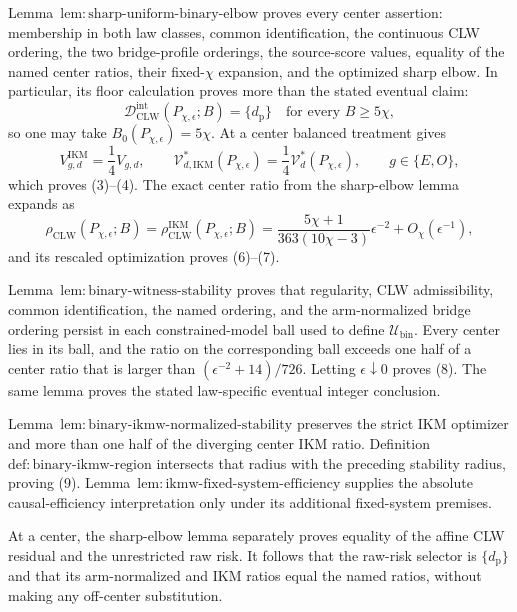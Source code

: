 Lemma~\(\mathrm{lem{:}sharp\text{-}uniform\text{-}binary\text{-}elbow}\) proves every center assertion: membership in both law classes, common identification, the continuous CLW ordering, the two bridge-profile orderings, the source-score values, equality of the named center ratios, their fixed-\(\chi\) expansion, and the optimized sharp elbow.  In particular, its floor calculation proves more than the stated eventual claim:
\[
 \mathcal D_{\mathrm{CLW}}^{\mathrm{int}}(P_{\chi,\epsilon};B)
 =\{d_{\mathrm p}\}
 \quad\text{for every }B\ge5\chi,
\]
so one may take \(B_0(P_{\chi,\epsilon})=5\chi\).  At a center balanced treatment gives
\[
 V_{g,d}^{\mathrm{IKM}}=\frac14V_{g,d},
 \qquad
 \mathcal V_{d,\mathrm{IKM}}^*(P_{\chi,\epsilon})
 =\frac14\mathcal V_d^*(P_{\chi,\epsilon}),
 \qquad g\in\{E,O\},                                    \tag{37}
\]
which proves (3)--(4).  The exact center ratio from the sharp-elbow lemma expands as
\[
 \rho_{\mathrm{CLW}}(P_{\chi,\epsilon};B)
 =\rho_{\mathrm{CLW}}^{\mathrm{IKM}}(P_{\chi,\epsilon};B)
 =\frac{5\chi+1}{363(10\chi-3)}\epsilon^{-2}
 +O_\chi(\epsilon^{-1}),
\]
and its rescaled optimization proves (6)--(7).

Lemma~\(\mathrm{lem{:}binary\text{-}witness\text{-}stability}\) proves that regularity, CLW admissibility, common identification, the named ordering, and the arm-normalized bridge ordering persist in each constrained-model ball used to define \(\mathcal U_{\mathrm{bin}}\).  Every center lies in its ball, and the ratio on the corresponding ball exceeds one half of a center ratio that is larger than \((\epsilon^{-2}+14)/726\).  Letting \(\epsilon\downarrow0\) proves (8).  The same lemma proves the stated law-specific eventual integer conclusion.

Lemma~\(\mathrm{lem{:}binary\text{-}ikmw\text{-}normalized\text{-}stability}\) preserves the strict IKM optimizer and more than one half of the diverging center IKM ratio.  Definition~\(\mathrm{def{:}binary\text{-}ikmw\text{-}region}\) intersects that radius with the preceding stability radius, proving (9).  Lemma~\(\mathrm{lem{:}ikmw\text{-}fixed\text{-}system\text{-}efficiency}\) supplies the absolute causal-efficiency interpretation only under its additional fixed-system premises.

At a center, the sharp-elbow lemma separately proves equality of the affine CLW residual and the unrestricted raw risk.  It follows that the raw-risk selector is \(\{d_{\mathrm p}\}\) and that its arm-normalized and IKM ratios equal the named ratios, without making any off-center substitution.

